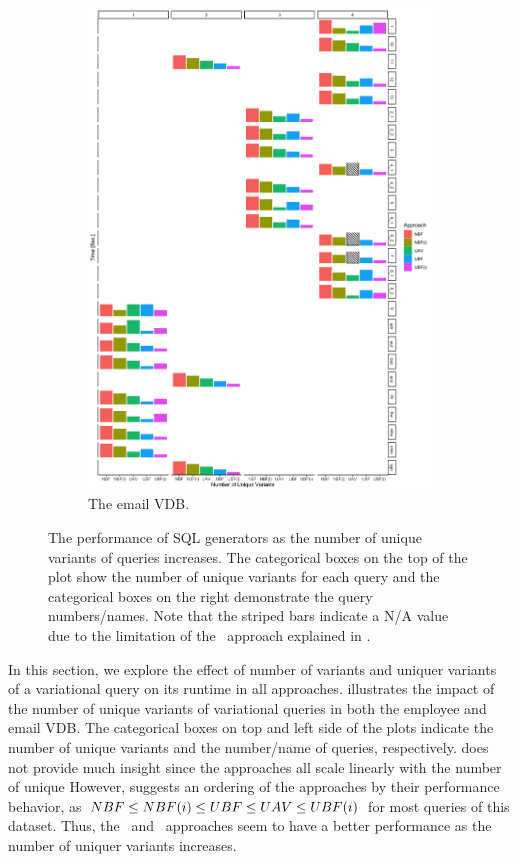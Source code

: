 \begin{figure}
\begin{subfigure}{.6\linewidth}
\includegraphics[width=\textwidth] {figs/plots/enron-comp-var.png}
\caption[The email VDB]{The email VDB.}
\label{fig:enron-var-comp}
\end{subfigure}
\caption[The performance of SQL generators as the number of unique variants of queries increases]{The performance of SQL generators as the number of unique variants of queries increases. The categorical boxes on the top of the plot show the number of
unique variants for each query and the categorical boxes on the right demonstrate the query 
numbers/names. Note that the striped bars indicate a N/A value due to the limitation of the
\uav\ approach explained in .}
\label{fig:var-comp}
\end{figure}


In this section, we explore the effect of number of variants and uniquer variants of a 
variational query on its runtime in all approaches. 
%
 illustrates the impact of the number of unique variants of variational
queries in both the employee and email VDB. 
%
The categorical boxes on top and left side of the plots indicate the number of unique
variants and the number/name of queries, respectively. 
%
 does 
not provide much insight since the approaches all scale linearly with the number of unique
However,  suggests an ordering of the approaches by their performance behavior, as $NBF \leq NBF(i) \leq UBF \leq UAV \leq UBF(i)$
for most queries of this dataset. Thus, the \uav\ and \ubfi\ approaches seem to have
a better performance as the number of uniquer variants increases. 


